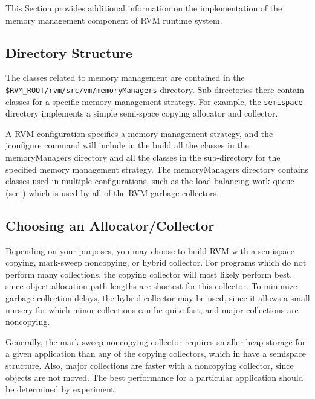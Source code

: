 This Section provides additional information on the implementation
of the memory management component of RVM runtime system.
 
\subsection{Directory Structure} \label{sssec:directories}
The classes related to memory management are contained in the 
{\tt \$RVM\_ROOT/rvm/src/vm/memoryManagers} directory.  Sub-directories
there
contain classes for a specific memory management strategy.
For example, the {\tt semispace} directory implements a
simple semi-space copying allocator and collector.

A RVM configuration specifies a memory management strategy, 
and the jconfigure command will include in the build all the
classes in the memoryManagers directory and all the classes in the
sub-directory for the specified memory management strategy.
The memoryManagers directory contains classes used in multiple
configurations, such as the load balancing work queue 
(see 
) which is used by all of the RVM garbage collectors.

\subsection{Choosing an Allocator/Collector} \label{ssec:choosinggc}
Depending on your purposes, you may choose to build RVM
with a semispace copying, mark-sweep noncopying, or hybrid collector.
For programs which do not perform many collections, the
copying collector will most likely perform best, since object
allocation path lengths are shortest for this collector.  To
minimize garbage collection delays, the hybrid collector may
be used, since it allows a small nursery for which minor collections
can be quite fast, and major collections are noncopying.  

Generally, the mark-sweep noncopying
collector requires smaller heap storage for a given application	
than any of the copying collectors, which in have a semispace structure.
Also, major collections are faster with a noncopying collector,
since objects are not moved.  The best performance for a particular	
application should be determined by experiment.

